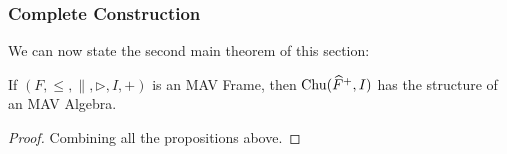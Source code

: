 \begin{proposition}
\end{proposition}

\subsubsection{Complete Construction}

We can now state the second main theorem of this section:

\begin{theorem}
  If $(F, \leq, \parallel, \rhd, I, +)$ is an MAV Frame, then
  $\mathrm{Chu}(\widehat{F}^+, I)$ has the structure of an MAV Algebra.
\end{theorem}

\begin{proof}
  Combining all the propositions above.
\end{proof}
